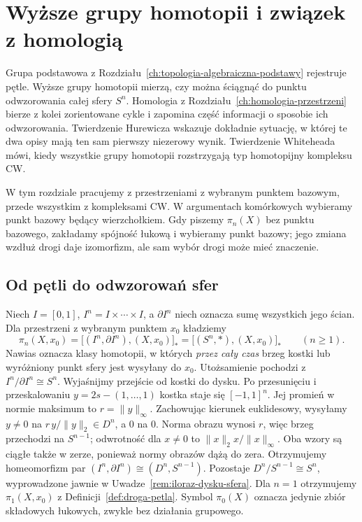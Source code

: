 \chapter{Wyższe grupy homotopii i związek z homologią}
\label{ch:wyzsza-homotopia}

Grupa podstawowa z Rozdziału~\ref{ch:topologia-algebraiczna-podstawy}
rejestruje pętle. Wyższe grupy homotopii mierzą, czy można
ściągnąć do punktu odwzorowania całej sfery $S^n$. Homologia z
Rozdziału~\ref{ch:homologia-przestrzeni} bierze z kolei
zorientowane cykle i zapomina część informacji o sposobie ich
odwzorowania. Twierdzenie Hurewicza wskazuje dokładnie sytuację,
w której te dwa opisy mają ten sam pierwszy niezerowy wynik.
Twierdzenie Whiteheada mówi, kiedy wszystkie grupy homotopii
rozstrzygają typ homotopijny kompleksu CW.

W tym rozdziale pracujemy z przestrzeniami z wybranym punktem bazowym,
przede wszystkim z kompleksami CW. W argumentach komórkowych
wybieramy punkt bazowy będący wierzchołkiem. Gdy piszemy
$\pi_n(X)$ bez punktu bazowego, zakładamy spójność łukową i
wybieramy punkt bazowy; jego zmiana wzdłuż drogi daje izomorfizm, ale
sam wybór drogi może mieć znaczenie.

\section{Od pętli do odwzorowań sfer}
\label{sec:grupy-pi-n}

\begin{definicja}
\label{def:pi-n}
Niech $I=[0,1]$, $I^n=I\times\cdots\times I$, a
$\partial I^n$ niech oznacza sumę wszystkich jego ścian.
Dla przestrzeni z wybranym punktem $x_0$ kładziemy
\[
 \pi_n(X,x_0)
 =\big[(I^n,\partial I^n),(X,x_0)\big]_*
 =\big[(S^n,*),(X,x_0)\big]_*
 \qquad(n\geq1).
\]
Nawias oznacza klasy homotopii, w których
\emph{przez cały czas} brzeg kostki lub wyróżniony
punkt sfery jest wysyłany do $x_0$.
Utożsamienie pochodzi z $I^n/\partial I^n\cong S^n$.
Wyjaśnijmy przejście od kostki do dysku. Po przesunięciu
i przeskalowaniu $y=2s-(1,\ldots,1)$ kostka staje się
$[-1,1]^n$. Jej promień w normie maksimum to
$r=\|y\|_\infty$. Zachowując kierunek euklidesowy, wysyłamy
$y\ne0$ na $r\,y/\|y\|_2\in D^n$, a $0$ na $0$.
Norma obrazu wynosi $r$, więc brzeg przechodzi na $S^{n-1}$;
odwrotność dla $x\ne0$ to $\|x\|_2x/\|x\|_\infty$.
Oba wzory są ciągłe także w zerze, ponieważ normy obrazów
dążą do zera. Otrzymujemy homeomorfizm par
$(I^n,\partial I^n)\cong(D^n,S^{n-1})$.
Pozostaje $D^n/S^{n-1}\cong S^n$, wyprowadzone jawnie
w Uwadze~\ref{rem:iloraz-dysku-sfera}.
Dla $n=1$ otrzymujemy $\pi_1(X,x_0)$ z
Definicji~\ref{def:droga-petla}. Symbol $\pi_0(X)$
oznacza jedynie zbiór składowych łukowych,
zwykle bez działania grupowego.
\end{definicja}

